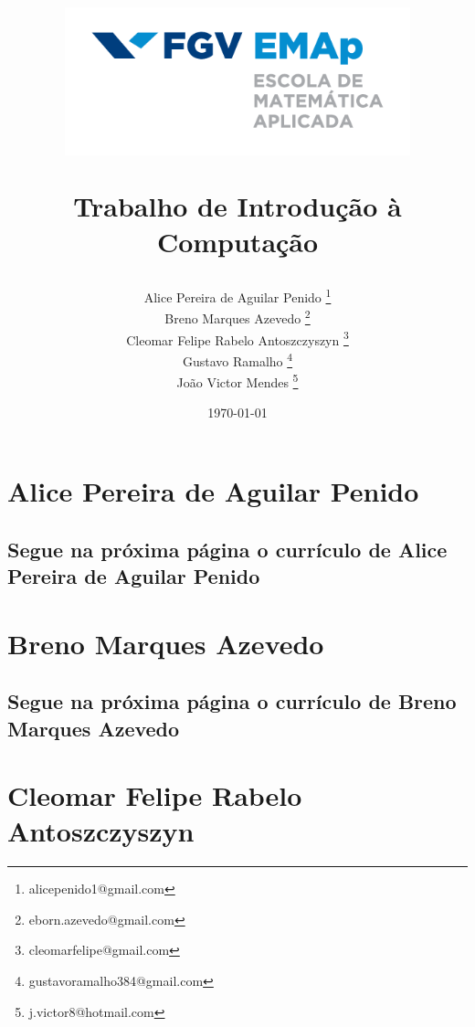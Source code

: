 \documentclass[oneside]{book}
\title{
	\begin{figure}[h]
		\centering
		\includegraphics[width=10cm]{imagens/logo.png} 		
	\end{figure}
	\textbf{Trabalho de Introdução à Computação}}
\author{
	Alice Pereira de Aguilar Penido \thanks{alicepenido1@gmail.com} \\
	Breno Marques Azevedo \thanks{eborn.azevedo@gmail.com} \\
	Cleomar Felipe Rabelo Antoszczyszyn \thanks{cleomarfelipe@gmail.com} \\
	Gustavo Ramalho \thanks{gustavoramalho384@gmail.com} \\
	João Victor Mendes  \thanks{j.victor8@hotmail.com}
}
\date{\today} %
\begin{document}
	{\selectfont 
		\maketitle
		\thispagestyle{empty}
		\setcounter{page}{1}
		\tableofcontents
		\listoffigures
		
		\chapter{Alice Pereira de Aguilar Penido}
		\section*{Segue na próxima página o currículo de Alice Pereira de Aguilar Penido}
		\restoregeometry
		
		
		\chapter{Breno Marques Azevedo}
		\section*{Segue na próxima página o currículo de Breno Marques Azevedo\cite{quantbytes}}
		\restoregeometry
		\newpage
		
	}
	
	\chapter{Cleomar Felipe Rabelo Antoszczyszyn}
\end{document}
